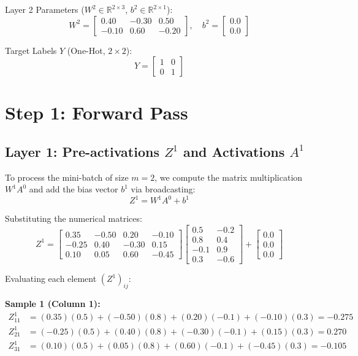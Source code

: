 \documentclass[11pt]{article}
\begin{document}
Layer 2 Parameters ($W^2 \in \mathbb{R}^{2\times3}$, $b^2 \in \mathbb{R}^{2\times1}$):
\[
W^2 =
\begin{bmatrix}
0.40 & -0.30 & 0.50 \\
-0.10 & 0.60 & -0.20
\end{bmatrix}, \quad
b^2 =
\begin{bmatrix} 0.0 \\ 0.0 \end{bmatrix}
\]

Target Labels $Y$ (One-Hot, $2 \times 2$):
\[
Y =
\begin{bmatrix}
1 & 0 \\
0 & 1
\end{bmatrix}
\]

\newpage
\section{Step 1: Forward Pass}

\subsection{Layer 1: Pre-activations \texorpdfstring{$Z^1$}{Z1} and Activations \texorpdfstring{$A^1$}{A1}}

To process the mini-batch of size $m=2$, we compute the matrix multiplication $W^1 A^0$ and add the bias vector $b^1$ via broadcasting:
\[
Z^1 = W^1 A^0 + b^1
\]

Substituting the numerical matrices:
\[
Z^1 = \begin{bmatrix} 0.35 & -0.50 & 0.20 & -0.10 \\ -0.25 & 0.40 & -0.30 & 0.15 \\ 0.10 & 0.05 & 0.60 & -0.45 \end{bmatrix} \begin{bmatrix} 0.5 & -0.2 \\ 0.8 & 0.4 \\ -0.1 & 0.9 \\ 0.3 & -0.6 \end{bmatrix} + \begin{bmatrix} 0.0 \\ 0.0 \\ 0.0 \end{bmatrix}
\]

Evaluating each element $(Z^1)_{ij}$:

\textbf{Sample 1 (Column 1):}
\begin{align*}
Z^1_{11} &= (0.35)(0.5) + (-0.50)(0.8) + (0.20)(-0.1) + (-0.10)(0.3) = -0.275 \\
Z^1_{21} &= (-0.25)(0.5) + (0.40)(0.8) + (-0.30)(-0.1) + (0.15)(0.3) = 0.270 \\
Z^1_{31} &= (0.10)(0.5) + (0.05)(0.8) + (0.60)(-0.1) + (-0.45)(0.3) = -0.105
\end{align*}
\end{document}
